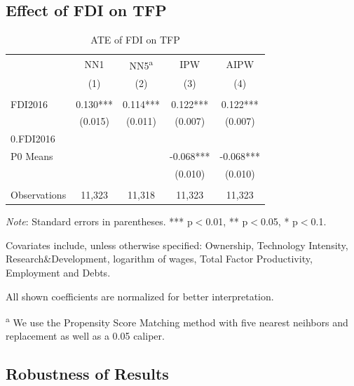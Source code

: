\documentclass[a4paper,11pt]{scrartcl}
\begin{document}
\subsection{Effect of FDI on TFP}
\begin{table}[h]
 	\centering
   	\caption{ATE of FDI on TFP}
   	\label{tab:mainresults}
\begin{threeparttable}

\begin{tabular}{lcccc} 
	\hline
	\hline
 			& NN1 & NN5\textsuperscript{a} & IPW & AIPW \\
 			& (1) & (2) & (3)  & (4) \\ \hline
 			&  &  &  &    \\
FDI2016 	& 0.130*** & 0.114*** & 0.122***  & 0.122***   \\
 			& (0.015) & (0.011) & (0.007) &   (0.007)  \\
0.FDI2016 	&  &  &  &    \\
P0 Means 	& & & -0.068*** & -0.068***\\
			&  &  & (0.010)  &  (0.010) \\
			&  &  &  &    \\
 Observations & 11,323 & 11,318 & 11,323 & 11,323 \\ 
 	\hline
 	\hline
\end{tabular}

\begin{tablenotes}[flushleft]
      \footnotesize
\item \textit{Note}: Standard errors in parentheses. *** p$<$0.01, ** p$<$0.05, * p$<$0.1.
\item Covariates include, unless otherwise specified: Ownership, Technology Intensity, Research\&Development, logarithm of wages, Total Factor Productivity, Employment and Debts. 
\item All shown coefficients are normalized for better interpretation. 
\item\textsuperscript{a} We use the Propensity Score Matching method with five nearest neihbors and replacement as well as a 0.05 caliper. 
\end{tablenotes}

\end{threeparttable}
\end{table}



\subsection{Robustness of Results}
\end{document}
